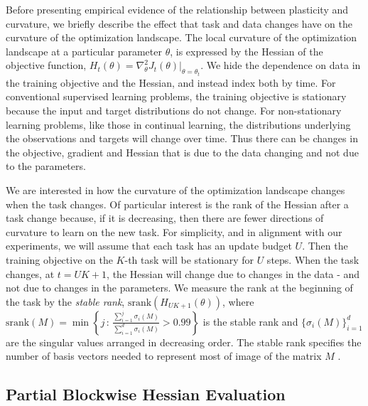 \documentclass{article}
\begin{document}
Before presenting empirical evidence of the relationship between plasticity and curvature, we briefly describe the effect that task and data changes have on the curvature of the optimization landscape.
The local curvature of the optimization landscape at a particular parameter $\theta$, is expressed by the Hessian of the objective function, $H_{t}(\theta) = \nabla_{\theta}^{2}J_{t}(\theta)\big|_{\theta = \theta_{t}}$.
We hide the dependence on data in the training objective and the Hessian, and instead index both by time.
For conventional supervised learning problems, the training objective is stationary because the input and target distributions do not change.
For non-stationary learning problems, like those in continual learning, the distributions underlying the observations and targets will change over time.
Thus there can be changes in the objective, gradient and Hessian that is due to the data changing and not due to the parameters.

We are interested in how the curvature of the optimization landscape changes when the task changes.
Of particular interest is the rank of the Hessian after a task change because, if it is decreasing, then there are fewer directions of curvature to learn on the new task.
For simplicity, and in alignment with our experiments, we will assume that each task has an update budget $U$.
Then the training objective on the $K$-th task will be stationary for $U$ steps.
When the task changes, at $t = UK + 1$, the Hessian will change due to changes in the data - and not due to changes in the parameters. 
We measure the rank at the beginning of the task by the \emph{stable rank}, $\text{srank}\left(H_{UK+1}(\theta)\right)$, where $\text{srank}(M) = \min \left\{ j \, : \, \frac{ \sum_{i=1}^{j}\sigma_{i}(M)}{\sum_{i=1}^{d}\sigma_{i}(M)} > 0.99\right\}$ is the stable rank and $\{\sigma_{i}(M)\}_{i=1}^{d}$ are the singular values arranged in decreasing order.
The stable rank specifies the number of basis vectors needed to represent most of image of the matrix $M$ \citep{yang19_harnes_struc_value_based_plann_reinf_learn,kumar20_implic_under_param_inhib_data}.


\subsection{Partial Blockwise Hessian Evaluation}
\end{document}
